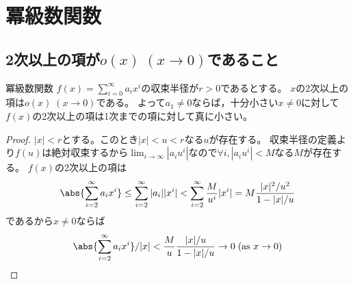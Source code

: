 \chapter{冪級数関数}
    \section{2次以上の項が\texorpdfstring{$o(x)\;(x\to 0)$}{o(x) (x→0)}であること}
        \begin{shadebox}
            冪級数関数
            $f(x) = \sum_{i=0}^\infty a_i x^i$の収束半径が$r>0$であるとする。
            $x$の2次以上の項は$o(x)\;(x\to 0)$である。
            よって$a_1\neq 0$ならば，十分小さい$x \neq 0$に対して$f(x)$の2次以上の項は1次までの項に対して真に小さい。
        \end{shadebox}
        \begin{proof}
            $|x|<r$とする。このとき$|x|<u<r$なる$u$が存在する。
            収束半径の定義より$f(u)$は絶対収束するから$\lim_{i\to\infty} |a_i u^i|$なので$\forall i, |a_i u^i| < M$なる$M$が存在する。
            $f(x)$の2次以上の項は
            \[ \abs{\sum_{i=2}^\infty a_i x^i} \leq \sum_{i=2}^\infty |a_i| |x^i| < \sum_{i=2}^\infty \frac{M}{u^i} |x^i| = M\frac{|x|^2/u^2}{1-|x|/u} \]
            であるから$x\neq 0$ならば
            \[ \abs{\sum_{i=2}^\infty a_i x^i}/|x| < \frac{M}{u}\frac{|x|/u}{1-|x|/u} \to 0\; (\text{as } x\to 0) \]
        \end{proof}